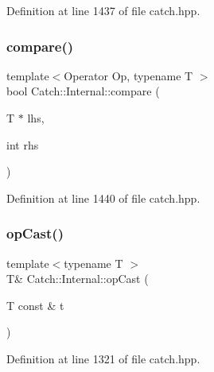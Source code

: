 Definition at line 1437 of file catch.\+hpp.

\hypertarget{namespace_catch_1_1_internal_a95361ddae55c9a390e6510bdadccb1fc}{}\label{namespace_catch_1_1_internal_a95361ddae55c9a390e6510bdadccb1fc} 
\subsubsection{\texorpdfstring{compare()}{compare()}\hspace{0.1cm}{\footnotesize\ttfamily [17/17]}}
{\footnotesize\ttfamily template$<$Operator Op, typename T $>$ \\
bool Catch\+::\+Internal\+::compare (\begin{DoxyParamCaption}\item[{T $\ast$}]{lhs,  }\item[{int}]{rhs }\end{DoxyParamCaption})}



Definition at line 1440 of file catch.\+hpp.

\hypertarget{namespace_catch_1_1_internal_adde98c1a650e94615e2b37ab0b3734e2}{}\label{namespace_catch_1_1_internal_adde98c1a650e94615e2b37ab0b3734e2} 
\subsubsection{\texorpdfstring{op\+Cast()}{opCast()}}
{\footnotesize\ttfamily template$<$typename T $>$ \\
T\& Catch\+::\+Internal\+::op\+Cast (\begin{DoxyParamCaption}\item[{T const \&}]{t }\end{DoxyParamCaption})\hspace{0.3cm}{\ttfamily [inline]}}



Definition at line 1321 of file catch.\+hpp.

